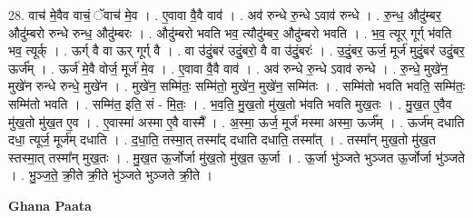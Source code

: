 \documentclass[17pt]{extarticle}
\begin{document}
28. वाच॑ मे॒वैव वाचं॒ ॅवाच॑ मे॒व । . ए॒वावा वै॒वै वाव॑ । . अव॑ रुन्धे रु॒न्धे ऽवाव॑ रुन्धे । . रु॒न्ध॒ औदु॑म्बर॒ औदु॑म्बरो रुन्धे रुन्ध॒ औदु॑म्बरः । . औदु॑म्बरो भवति भव॒ त्यौदु॑म्बर॒ औदु॑म्बरो भवति । . भ॒व॒ त्यूर् गूर्ग् भ॑वति भव॒ त्यूर्क् । . ऊर्ग् वै वा ऊर् गूर्ग् वै । . वा उ॑दुं॒बर॑ उदुं॒बरो॒ वै वा उ॑दुं॒बरः॑ । . उ॒दुं॒बर॒ ऊर्ज॒ मूर्ज॑ मुदुं॒बर॑ उदुं॒बर॒ ऊर्ज᳚म् । . ऊर्ज॑ मे॒वै वोर्ज॒ मूर्ज॑ मे॒व । . ए॒वावा वै॒वै वाव॑ । . अव॑ रुन्धे रु॒न्धे ऽवाव॑ रुन्धे । . रु॒न्धे॒ मुखे॑न॒ मुखे॑न रुन्धे रुन्धे॒ मुखे॑न । . मुखे॑न॒ सम्मि॑तः॒ सम्मि॑तो॒ मुखे॑न॒ मुखे॑न॒ सम्मि॑तः । . सम्मि॑तो भवति भवति॒ सम्मि॑तः॒ सम्मि॑तो भवति । . सम्मि॑त॒ इति॒ सं - मि॒तः॒ । . भ॒व॒ति॒ मु॒ख॒तो मु॑ख॒तो भ॑वति भवति मुख॒तः । . मु॒ख॒त ए॒वैव मु॑ख॒तो मु॑ख॒त ए॒व । . ए॒वास्मा॑ अस्मा ए॒वै वास्मै᳚ । . अ॒स्मा॒ ऊर्ज॒ मूर्ज॑ मस्मा अस्मा॒ ऊर्ज᳚म् । . ऊर्ज॑म् दधाति दधा॒ त्यूर्ज॒ मूर्ज॑म् दधाति । . द॒धा॒ति॒ तस्मा॒त् तस्मा᳚द् दधाति दधाति॒ तस्मा᳚त् । . तस्मा᳚न् मुख॒तो मु॑ख॒त स्तस्मा॒त् तस्मा᳚न् मुख॒तः । . मु॒ख॒त ऊ॒र्जोर्जा मु॑ख॒तो मु॑ख॒त ऊ॒र्जा । . ऊ॒र्जा भु॑ञ्जते भुञ्जत ऊ॒र्जोर्जा भु॑ञ्जते । . भु॒ञ्ज॒ते॒ क्री॒ते क्री॒ते भु॑ञ्जते भुञ्जते क्री॒ते । \newline

\textbf{Ghana Paata } \newline
\end{document}
